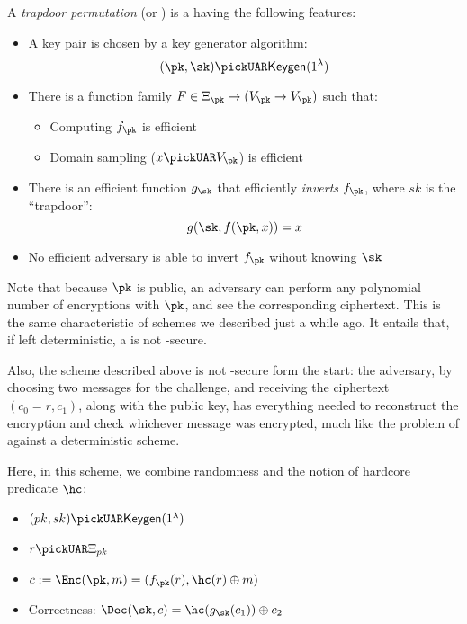 A \emph{trapdoor permutation} (or \tdp) is a \owp{} having the following features:

\begin{itemize}
    \item A key pair is chosen \uar{} by a key generator algorithm:
    \[
        (\pk, \sk) \pickUAR \keygen(1^\lambda)
    \]
    \item There is a function family $F \in \Xi_\pk \to (V_{\pk} \to V_{\pk})$ such that:
    \begin{itemize}
        \item Computing $f_{\pk}$ is efficient
        \item Domain sampling ($x \pickUAR V_{\pk}$) is efficient
    \end{itemize}
    \item There is an efficient function $g_{\sk}$ that efficiently \emph{inverts} $f_{\pk}$, where $sk$ is the ``trapdoor'': 
    \[
        g(\sk, f(\pk, x)) = x
    \]
    \item No efficient adversary is able to invert $f_{\pk}$ wihout knowing $\sk$
\end{itemize}

Note that because $\pk$ is public, an adversary can perform any polynomial number of encryptions with $\pk$, and see the corresponding ciphertext. This is the same characteristic of \pke{} schemes we described just a while ago. It entails that, if left deterministic, a \tdp{} is not \cpa-secure.

Also, the scheme described above is not \cpa-secure form the start: the adversary, by choosing two messages for the challenge, and receiving the ciphertext $(c_0 = r, c_1)$, along with the public key, has everything needed to reconstruct the encryption and check whichever message was encrypted, much like the problem of \ufcma against a deterministic \mac scheme.

Here, in this scheme, we combine randomness and the notion of hardcore predicate $\hc$:

\begin{itemize}
    \item $(pk, sk) \pickUAR \keygen(1^\lambda)$
    \item $r \pickUAR \Xi_{pk}$
    \item $c := \Enc(\pk, m) = (f_{\pk}(r), \hc(r) \oplus m)$
    \item Correctness: $\Dec(\sk, c) = \hc(g_{\sk}(c_1)) \oplus c_2$
\end{itemize}

